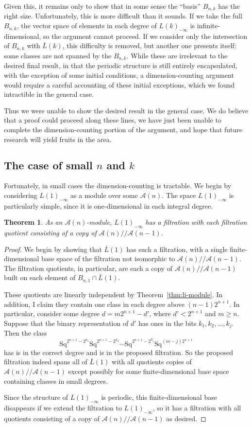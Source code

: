 \documentclass{article}
\newcommand{\A}{\mathcal{A}}
\newcommand{\Sq}{\mathrm{Sq}}
\newcommand{\mmod}{/\!/\!}
\renewcommand{\L}{\bar{L}}
\newcommand{\Lkm}[1][k]{L{(#1)}_{-\infty}}
\newtheorem{thm}{Theorem}
\begin{document}
Given this, it remains only to show that in some sense the ``basis'' $B_{n,k}$ has the right size.  Unfortunately, this is more difficult than it sounds.  If we take the full $B_{n,k}$, the vector space of elements in each degree of $\Lkm$ is infinite-dimensional, so the argument cannot proceed.  If we consider only the intersection of $B_{n,k}$ with $\L(k)$, this difficulty is removed, but another one presents itself: some classes are not spanned by the $B_{n,k}$.  While these are irrelevant to the desired final result, in that the periodic structure is still entirely encapsulated, with the exception of some initial conditions, a dimension-counting argument would require a careful accounting of these initial exceptions, which we found intractible in the general case.

Thus we were unable to show the desired result in the general case.  We do believe that a proof could proceed along these lines, we have just been unable to complete the dimension-counting portion of the argument, and hope that future research will yield fruits in the area.

\subsection{The case of small \boldmath$n$ and \boldmath$k$}

Fortunately, in small cases the dimension-counting is tractable.  We begin by considering $\Lkm[1]$ as a module over some $\A(n)$.  The space $\Lkm[1]$ is particularly simple, since it is one-dimensional in each integral degree.

\begin{thm}
  As an $\A(n)$-module, $\Lkm[1]$ has a filtration with each filtration quotient consisting of a copy of $\A(n)\mmod\A(n-1)$.
\end{thm}
\begin{proof}
  We begin by showing that $\L(1)$ has such a filtration, with a single finite-dimensional base space of the filtration not isomorphic to $\A(n)\mmod\A(n-1)$.  The filtration quotients, in particular, are each a copy of $\A(n)\mmod\A(n-1)$ built on each element of $B_{n,1}\cap\L(1)$.

  These quotients are linearly independent by Theorem~\ref{thm:li-module}.  In addition, I claim they contain one class in each degree above $(n-1)2^{n+1}$.  In particular, consider some degree $d = m2^{n+1} - d'$, where $d' < 2^{n+1}$ and $m \geq n$.  Suppose that the binary representation of $d'$ has ones in the bits $k_1, k_2, \ldots, k_j$.  Then the class 
  \[\Sq^{2^{n+1}-2^{k_1}}\Sq^{2^{n+1}-2^{k_2}}\cdots\Sq^{2^{n+1}-2^{k_j}}\Sq^{(m-j)2^{n+1}} \]
  has is in the correct degree and is in the proposed filtration.  So the proposed filtration indeed spans all of $\L(1)$ with all quotients copies of $\A(n)\mmod\A(n-1)$ except possibly for some finite-dimensional base space containing classes in small degrees.

  Since the structure of $\Lkm[1]$ is periodic, this finite-dimensional base disappears if we extend the filtration to $\Lkm[1]$, so it has a filtration with all quotients consisting of a copy of $\A(n)\mmod\A(n-1)$ as desired.
\end{proof}
\end{document}
